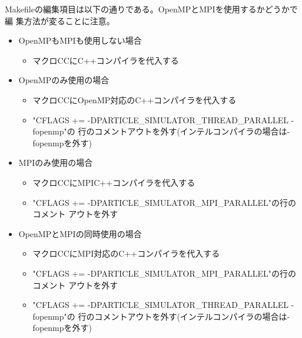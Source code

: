 Makefileの編集項目は以下の通りである。OpenMPとMPIを使用するかどうかで編
集方法が変ることに注意。
\begin{itemize}
\item OpenMPもMPIも使用しない場合
  \begin{itemize}
  \item マクロCCにC++コンパイラを代入する
  \end{itemize}

\item OpenMPのみ使用の場合
  \begin{itemize}
  \item マクロCCにOpenMP対応のC++コンパイラを代入する
  \item "CFLAGS += -DPARTICLE\_SIMULATOR\_THREAD\_PARALLEL -fopenmp"の
    行のコメントアウトを外す(インテルコンパイラの場合は-fopenmpを外す)
  \end{itemize}

\item MPIのみ使用の場合
  \begin{itemize}
  \item マクロCCにMPIC++コンパイラを代入する
  \item "CFLAGS += -DPARTICLE\_SIMULATOR\_MPI\_PARALLEL"の行のコメント
    アウトを外す
  \end{itemize}

\item OpenMPとMPIの同時使用の場合
  \begin{itemize}
  \item マクロCCにMPI対応のC++コンパイラを代入する
  \item "CFLAGS += -DPARTICLE\_SIMULATOR\_MPI\_PARALLEL"の行のコメント
    アウトを外す
  \item "CFLAGS += -DPARTICLE\_SIMULATOR\_THREAD\_PARALLEL -fopenmp"の
    行のコメントアウトを外す(インテルコンパイラの場合は-fopenmpを外す)
  \end{itemize}

\end{itemize}

